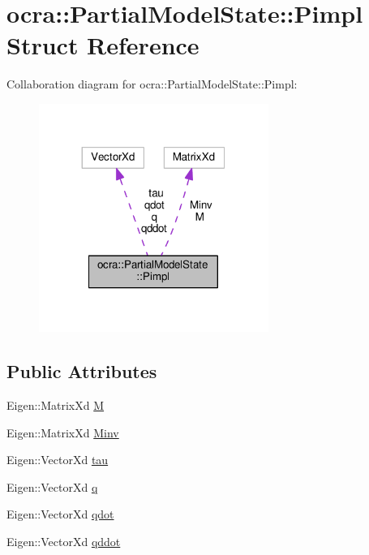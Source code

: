 \hypertarget{structocra_1_1PartialModelState_1_1Pimpl}{}\section{ocra\+:\+:Partial\+Model\+State\+:\+:Pimpl Struct Reference}
\label{structocra_1_1PartialModelState_1_1Pimpl}


Collaboration diagram for ocra\+:\+:Partial\+Model\+State\+:\+:Pimpl\+:
\nopagebreak
\begin{figure}[H]
\begin{center}
\leavevmode
\includegraphics[width=212pt]{d6/da2/structocra_1_1PartialModelState_1_1Pimpl__coll__graph}
\end{center}
\end{figure}
\subsection*{Public Attributes}
\begin{DoxyCompactItemize}
\item 
Eigen\+::\+Matrix\+Xd \hyperlink{structocra_1_1PartialModelState_1_1Pimpl_aac1b2af908cd347c7c295d0461f605b7}{M}
\item 
Eigen\+::\+Matrix\+Xd \hyperlink{structocra_1_1PartialModelState_1_1Pimpl_a8fc2e9335c4fc0ff753fdb9850ad7bd5}{Minv}
\item 
Eigen\+::\+Vector\+Xd \hyperlink{structocra_1_1PartialModelState_1_1Pimpl_a74798b71925f4049758733f78a6cd571}{tau}
\item 
Eigen\+::\+Vector\+Xd \hyperlink{structocra_1_1PartialModelState_1_1Pimpl_a1533bd101072998a086254a0bdd9b9e9}{q}
\item 
Eigen\+::\+Vector\+Xd \hyperlink{structocra_1_1PartialModelState_1_1Pimpl_afaef50e83183344243397f3001f25c26}{qdot}
\item 
Eigen\+::\+Vector\+Xd \hyperlink{structocra_1_1PartialModelState_1_1Pimpl_a5a7b9332901dfbde222881933efe9a0d}{qddot}
\end{DoxyCompactItemize}


